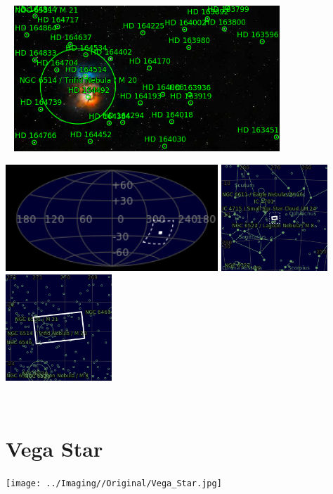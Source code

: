 \begin{center}
 \ \newpage
\includegraphics[width=0.75\textwidth]{../Imaging//Annotated/Trifid_Nebula_Annotated.jpg}

\includegraphics[height=4cm]{../Imaging//Annotated/Trifid_Nebula_Globe.jpg}
\includegraphics[height=4cm]{../Imaging//Annotated/Trifid_Nebula_Close.jpg}
\includegraphics[height=4cm]{../Imaging//Annotated/Trifid_Nebula_Closer.jpg}
\end{center}
\ \\\section{Vega Star}
\texttt{[image: ../Imaging//Original/Vega\_Star.jpg]}
